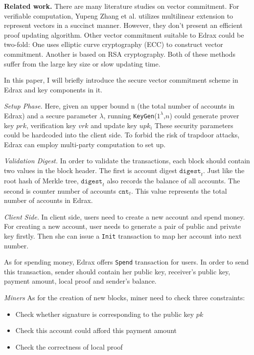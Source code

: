 \documentclass[conference]{IEEEtran}
\begin{document}
\textbf{Related work.}
There are many literature studies on vector commitment.
%
For verifiable computation, Yupeng Zhang et al. utilizes multilinear extension to represent vectors in a succinct manner.
%
However, they don't present an efficient proof updating algorithm.
%
Other vector commitment suitable to Edrax could be two-fold:
%
One uses elliptic curve cryptography (ECC) to construct vector commitment.
%
Another is based on RSA cryptography.
%
Both of these methods suffer from the large key size or slow updating time.

In this paper, I will briefly introduce the secure vector commitment scheme in Edrax and key components in it.

\textit{Setup Phase.}
Here, given an upper bound n (the total number of accounts in Edrax) and a secure parameter $\lambda$, running \texttt{KeyGen}($1^{\lambda}$,$n$) could generate prover key $prk$, verification key $vrk$ and update key $upk_i$
%
These security parameters could be hardcoded into the client side.
%
To forbid the risk of trapdoor attacks, Edrax can employ multi-party computation to set up.

\textit{Validation Digest.}
In order to validate the transactions, each block should contain two values in the block header. 
%
The first is account digest $\texttt{digest}_t$. 
%
Just like the root hash of Merkle tree, $\texttt{digest}_t$ also records the balance of all accounts.
%
The second is counter number of accounts $\texttt{cnt}_t$. 
%
This value represents the total number of accounts in Edrax.

\textit{Client Side.}
In client side, users need to create a new account and spend money.
%
For creating a new account, user needs to generate a pair of public and private key firstly.
%
Then she can issue a \texttt{Init} transaction to map her account into next number.

As for spending money, Edrax offers \texttt{Spend} transaction for users. 
%
In order to send this transaction, sender should contain her public key, receiver's public key, payment amount, local proof and sender's balance.

\textit{Miners}
As for the creation of new blocks, miner need to check three constraints:

\begin{itemize}
  \item Check whether signature is corresponding to the public key $pk$
  \item Check this account could afford this payment amount
  \item Check the correctness of local proof
\end{itemize}
\end{document}

